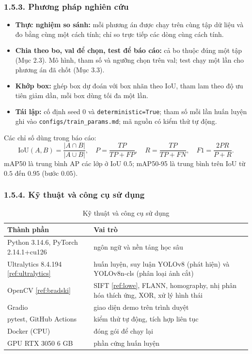\documentclass[11pt,a4paper]{article}
\newcommand{\tlr}[1]{\ref{ref:#1}}
\newcommand{\chude}[1]{\subsubsection*{#1}}
\begin{document}
\chude{1.5.3. Phương pháp nghiên cứu}

\begin{itemize}
  \item \textbf{Thực nghiệm so sánh:} mỗi phương án được chạy trên cùng tập dữ liệu và đo bằng cùng một cách tính; chỉ so trực tiếp các dòng cùng cách tính.
  \item \textbf{Chia theo bo, val để chọn, test để báo cáo:} cả bo thuộc đúng một tập (Mục 2.3). Mô hình, tham số và ngưỡng chọn trên val; test chạy một lần cho phương án đã chốt (Mục 3.3).
  \item \textbf{Khớp box:} ghép box dự đoán với box nhãn theo IoU, tham lam theo độ ưu tiên giảm dần, mỗi box dùng tối đa một lần.
  \item \textbf{Tái lập:} cố định seed $0$ và \texttt{deterministic=True}; tham số mỗi lần huấn luyện ghi vào \texttt{configs/\allowbreak train\_params.md}; mã nguồn có kiểm thử tự động.
\end{itemize}

Các chỉ số dùng trong báo cáo:
\[
\mathrm{IoU}(A,B)=\frac{|A\cap B|}{|A\cup B|},\quad
P=\frac{TP}{TP+FP},\quad
R=\frac{TP}{TP+FN},\quad
F1=\frac{2PR}{P+R}.
\]
mAP50 là trung bình AP các lớp ở IoU $0.5$; mAP50-95 là trung bình trên IoU từ $0.5$ đến $0.95$ (bước $0.05$).

\chude{1.5.4. Kỹ thuật và công cụ sử dụng}

\begin{table}[H]
\centering
\small
\caption{Kỹ thuật và công cụ sử dụng}\label{tab:congcu}
\begin{tabular}{l|p{9.4cm}}
\toprule
\textbf{Thành phần} & \textbf{Vai trò} \\ \midrule
Python 3.14.6, PyTorch 2.14.1+cu126 & ngôn ngữ và nền tảng học sâu \\
Ultralytics 8.4.194 \tlr{ultralytics} & huấn luyện, suy luận YOLOv8 (phát hiện) và YOLOv8n-cls (phân loại ảnh cắt) \\
OpenCV \tlr{bradski} & SIFT \tlr{lowe}, FLANN, homography, nhị phân hóa thích ứng, XOR, xử lý hình thái \\
Gradio & giao diện demo trên trình duyệt \\
pytest, GitHub Actions & kiểm thử tự động, tích hợp liên tục \\
Docker (CPU) & đóng gói để chạy lại \\
GPU RTX 3050 6 GB & phần cứng huấn luyện \\ \bottomrule
\end{tabular}
\end{table}
\end{document}
